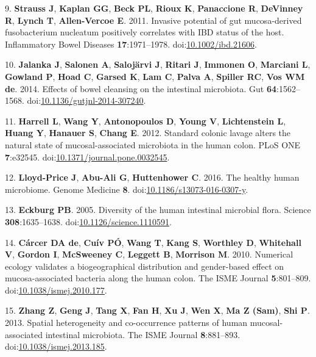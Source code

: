 \documentclass[11pt,]{article}
\begin{document}
\hypertarget{ref-Strauss2011}{}
9. \textbf{Strauss J}, \textbf{Kaplan GG}, \textbf{Beck PL},
\textbf{Rioux K}, \textbf{Panaccione R}, \textbf{DeVinney R},
\textbf{Lynch T}, \textbf{Allen-Vercoe E}. 2011. Invasive potential of
gut mucosa-derived fusobacterium nucleatum positively correlates with
IBD status of the host. Inflammatory Bowel Diseases
\textbf{17}:1971--1978.
doi:\href{https://doi.org/10.1002/ibd.21606}{10.1002/ibd.21606}.

\hypertarget{ref-Jalanka2014}{}
10. \textbf{Jalanka J}, \textbf{Salonen A}, \textbf{Salojärvi J},
\textbf{Ritari J}, \textbf{Immonen O}, \textbf{Marciani L},
\textbf{Gowland P}, \textbf{Hoad C}, \textbf{Garsed K}, \textbf{Lam C},
\textbf{Palva A}, \textbf{Spiller RC}, \textbf{Vos WM de}. 2014. Effects
of bowel cleansing on the intestinal microbiota. Gut
\textbf{64}:1562--1568.
doi:\href{https://doi.org/10.1136/gutjnl-2014-307240}{10.1136/gutjnl-2014-307240}.

\hypertarget{ref-Harrell2012}{}
11. \textbf{Harrell L}, \textbf{Wang Y}, \textbf{Antonopoulos D},
\textbf{Young V}, \textbf{Lichtenstein L}, \textbf{Huang Y},
\textbf{Hanauer S}, \textbf{Chang E}. 2012. Standard colonic lavage
alters the natural state of mucosal-associated microbiota in the human
colon. PLoS ONE \textbf{7}:e32545.
doi:\href{https://doi.org/10.1371/journal.pone.0032545}{10.1371/journal.pone.0032545}.

\hypertarget{ref-LloydPrice2016}{}
12. \textbf{Lloyd-Price J}, \textbf{Abu-Ali G}, \textbf{Huttenhower C}.
2016. The healthy human microbiome. Genome Medicine \textbf{8}.
doi:\href{https://doi.org/10.1186/s13073-016-0307-y}{10.1186/s13073-016-0307-y}.

\hypertarget{ref-Eckburg2005}{}
13. \textbf{Eckburg PB}. 2005. Diversity of the human intestinal
microbial flora. Science \textbf{308}:1635--1638.
doi:\href{https://doi.org/10.1126/science.1110591}{10.1126/science.1110591}.

\hypertarget{ref-deCarcer2010}{}
14. \textbf{Cárcer DA de}, \textbf{Cuív PÓ}, \textbf{Wang T},
\textbf{Kang S}, \textbf{Worthley D}, \textbf{Whitehall V},
\textbf{Gordon I}, \textbf{McSweeney C}, \textbf{Leggett B},
\textbf{Morrison M}. 2010. Numerical ecology validates a biogeographical
distribution and gender-based effect on mucosa-associated bacteria along
the human colon. The ISME Journal \textbf{5}:801--809.
doi:\href{https://doi.org/10.1038/ismej.2010.177}{10.1038/ismej.2010.177}.

\hypertarget{ref-Zhang2013}{}
15. \textbf{Zhang Z}, \textbf{Geng J}, \textbf{Tang X}, \textbf{Fan H},
\textbf{Xu J}, \textbf{Wen X}, \textbf{Ma Z (Sam)}, \textbf{Shi P}.
2013. Spatial heterogeneity and co-occurrence patterns of human
mucosal-associated intestinal microbiota. The ISME Journal
\textbf{8}:881--893.
doi:\href{https://doi.org/10.1038/ismej.2013.185}{10.1038/ismej.2013.185}.
\end{document}

